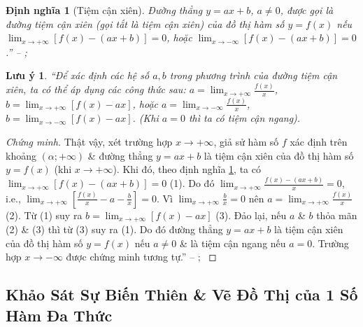 \documentclass{article}
\numberwithin{equation}{section}
\newtheorem{dinhnghia}{Định nghĩa}[section]
\newtheorem{luuy}{Lưu ý}[section]
\begin{document}
\begin{dinhnghia}[Tiệm cận xiên]
	\label{def:tiem can xien}
	Đường thẳng $y = ax + b$, $a\ne 0$, được gọi là \emph{đường tiệm cận xiên} (gọi tắt là \emph{tiệm cận xiên}) của đồ thị hàm số $y = f(x)$ nếu $\lim_{x\to+\infty} [f(x) - (ax + b)] = 0$, hoặc $\lim_{x\to-\infty} [f(x) - (ax + b)] = 0$.'' -- \cite[p. 32]{SGK_Toan_12_giai_tich_nang_cao}; \cite[p. 13]{TL_chuyen_Toan_Giai_Tich_12}
\end{dinhnghia}

\begin{luuy}
	``Để xác định các hệ số $a,b$ trong phương trình của đường tiệm cận xiên, ta có thể áp dụng các công thức sau: $a = \lim_{x\to+\infty} \frac{f(x)}{x}$, $b = \lim_{x\to+\infty} [f(x) - ax]$, hoặc $a = \lim_{x\to-\infty} \frac{f(x)}{x}$, $b = \lim_{x\to-\infty} [f(x) - ax]$. (Khi $a = 0$ thì ta có tiệm cận ngang).
\end{luuy}

\begin{proof}[Chứng minh]
	Thật vậy, xét trường hợp $x\to+\infty$, giả sử hàm số $f$ xác định trên khoảng $(\alpha;+\infty)$ \& đường thẳng $y = ax + b$ là tiệm cận xiên của đồ thị hàm số $y = f(x)$ (khi $x\to+\infty$). Khi đó, theo định nghĩa \ref{def:tiem can xien}, ta có $\lim_{x\to+\infty} [f(x) - (ax + b)] = 0$ (1). Do đó $\lim_{x\to+\infty} \frac{f(x) - (ax + b)}{x} = 0$, i.e., $\lim_{x\to+\infty} \left[\frac{f(x)}{x} - a - \frac{b}{x}\right] = 0$. Vì $\lim_{x\to+\infty} \frac{b}{x} = 0$ nên $a = \lim_{x\to+\infty} \frac{f(x)}{x}$ (2). Từ (1) suy ra $b = \lim_{x\to+\infty} [f(x) - ax]$ (3). Đảo lại, nếu $a$ \& $b$ thỏa mãn (2) \& (3) thì từ (3) suy ra (1). Do đó đường thẳng $y = ax + b$ là tiệm cận xiên của đồ thị hàm số $y = f(x)$ nếu $a\ne 0$ \& là tiệm cận ngang nếu $a = 0$. Trường hợp $x\to-\infty$ được chứng minh tương tự.'' -- \cite[p. 34]{SGK_Toan_12_giai_tich_nang_cao}; \cite[pp. 14--15]{TL_chuyen_Toan_Giai_Tich_12}
\end{proof}


\subsection{Khảo Sát Sự Biến Thiên \& Vẽ Đồ Thị của 1 Số Hàm Đa Thức}
\end{document}
